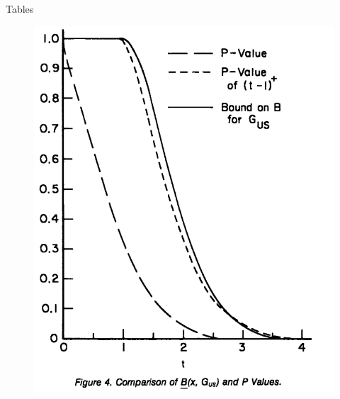\begin{frame}{Tables}

\begin{figure}[t]
\includegraphics[height=0.8\textheight]{figures/figure4}
\centering
\end{figure}

\end{frame}
